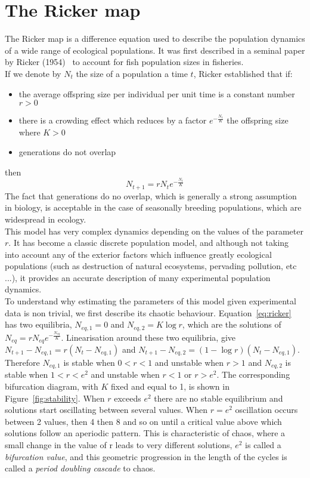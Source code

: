 \documentclass{report}
\begin{document}
	\section*{The Ricker map}
	The Ricker map is a difference equation used to describe the population dynamics of a wide range of ecological populations. It was first described in a seminal paper by Ricker (1954)~\cite{Ricker1954} to account for fish population sizes in fisheries. \\
	If we denote by $N_t$ the size of a population a time $t$, Ricker established that if:
	\begin{itemize}
		\item the average offspring size per individual per unit time is a constant number $r > 0$
		\item there is a crowding effect which reduces by a factor $e^{-\frac{N_t}{K}}$ the offspring size where $K > 0$
		\item generations do not overlap
	\end{itemize}
	then 
	\begin{equation}
		N_{t+1} = r N_t e^{-\frac{N_t}{K}}
		\label{eq:ricker}
	\end{equation}
	The fact that generations do no overlap, which is generally a strong assumption in biology, is acceptable in the case of seasonally breeding populations, which are widespread in ecology. \\
	This model has very complex dynamics depending on the values of the parameter $r$. It has become a classic discrete population model, and although not taking into account any of the exterior factors which influence greatly ecological populations (such as destruction of natural ecosystems, pervading pollution, etc ...), it provides an accurate description of many experimental population dynamics. \\
	To understand why estimating the parameters of this model given experimental data is non trivial, we first describe its chaotic behaviour. Equation~\ref{eq:ricker} has two equilibria, $N_{eq, 1} = 0$ and $N_{eq, 2} = K\log r$, which are the solutions of  $N_{eq} = r N_{eq} e^{-\frac{N_{eq}}{K}}$. Linearisation around these two equilibria, give $N_{t+1} - N_{eq, 1} = r(N_{t} - N_{eq, 1})$ and $N_{t+1} - N_{eq, 2} = (1-\log r)(N_{t} - N_{eq, 1})$. Therefore $N_{eq, 1}$ is stable when $0 < r < 1$ and unstable when $r > 1$ and $N_{eq, 2}$ is stable when $1 < r < e^2$ and unstable when $r < 1$ or $r > e^2$. The corresponding bifurcation diagram, with $K$ fixed and equal to 1, is shown in Figure~\ref{fig:stability}. When $r$ exceeds $e^2$ there are no stable equilibrium and solutions start oscillating between several values. When $r=e^2$ oscillation occurs between 2 values, then 4 then 8 and so on until a critical value above which solutions follow an aperiodic pattern. This is characteristic of chaos, where a small change in the value of r leads to very different solutions,  $e^2$ is called a \emph{bifurcation value}, and this geometric progression in the length of the cycles is called a \emph{period doubling cascade} to chaos.
	
\end{document}
